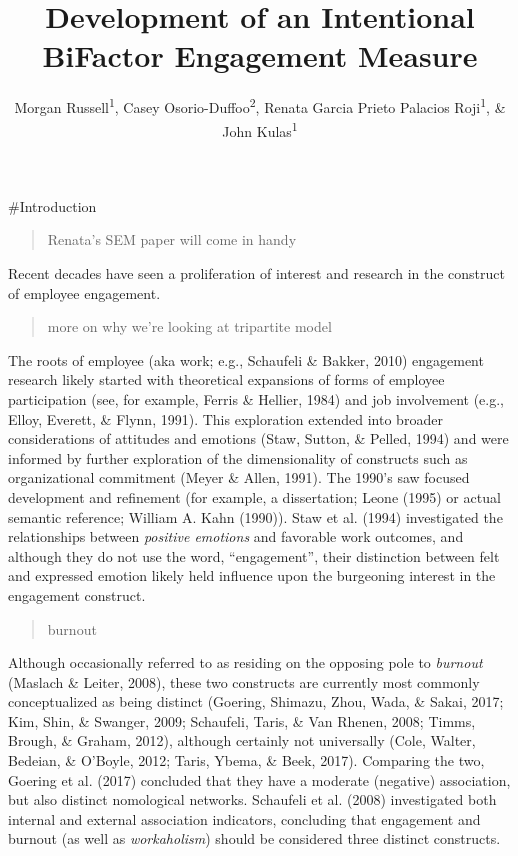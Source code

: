 \documentclass[
  english,
  man]{apa6}
\title{Development of an Intentional BiFactor Engagement Measure}
\author{Morgan Russell\textsuperscript{1}, Casey Osorio-Duffoo\textsuperscript{2}, Renata Garcia Prieto Palacios Roji\textsuperscript{1}, \& John Kulas\textsuperscript{1}}
\date{}
\affiliation{\vspace{0.5cm}\textsuperscript{1} Montclair State University\\\textsuperscript{2} Harver}
\begin{document}
\maketitle

\#Introduction

\begin{quote}
Renata's SEM paper will come in handy
\end{quote}

Recent decades have seen a proliferation of interest and research in the construct of employee engagement.

\begin{quote}
more on why we're looking at tripartite model
\end{quote}

The roots of employee (aka work; e.g., Schaufeli \& Bakker, 2010) engagement research likely started with theoretical expansions of forms of employee participation (see, for example, Ferris \& Hellier, 1984) and job involvement (e.g., Elloy, Everett, \& Flynn, 1991). This exploration extended into broader considerations of attitudes and emotions (Staw, Sutton, \& Pelled, 1994) and were informed by further exploration of the dimensionality of constructs such as organizational commitment (Meyer \& Allen, 1991). The 1990's saw focused development and refinement (for example, a dissertation; Leone (1995) or actual semantic reference; William A. Kahn (1990)). Staw et al. (1994) investigated the relationships between \emph{positive emotions} and favorable work outcomes, and although they do not use the word, \enquote{engagement}, their distinction between felt and expressed emotion likely held influence upon the burgeoning interest in the engagement construct.

\begin{quote}
burnout
\end{quote}

Although occasionally referred to as residing on the opposing pole to \emph{burnout} (Maslach \& Leiter, 2008), these two constructs are currently most commonly conceptualized as being distinct (Goering, Shimazu, Zhou, Wada, \& Sakai, 2017; Kim, Shin, \& Swanger, 2009; Schaufeli, Taris, \& Van Rhenen, 2008; Timms, Brough, \& Graham, 2012), although certainly not universally (Cole, Walter, Bedeian, \& O'Boyle, 2012; Taris, Ybema, \& Beek, 2017). Comparing the two, Goering et al. (2017) concluded that they have a moderate (negative) association, but also distinct nomological networks. Schaufeli et al. (2008) investigated both internal and external association indicators, concluding that engagement and burnout (as well as \emph{workaholism}) should be considered three distinct constructs.
\end{document}
